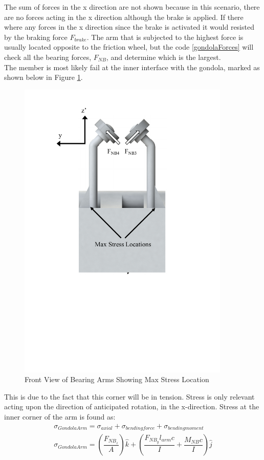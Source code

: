 \documentclass[../main.tex]{subfiles}
\begin{document}
The sum of forces in the x direction are not shown because in this scenario, there are no forces acting in the x direction although the brake is applied. If there where any forces in the x direction since the brake is activated it would resisted by the braking force $F_{brake}$. The arm that is subjected to the highest force is usually located opposite to the friction wheel, but the code \ref{gondolaForces} will check all the bearing forces, $F_{NB}$, and determine which is the largest. \\

The member is most likely fail at the inner interface with the gondola, marked as shown below in Figure \ref{fig:armStressLocation}. 
\begin{figure}[H]
	\centering
	\includegraphics[width=0.9\textwidth]{img/gondola/BearingArmStressLocation.pdf}
	\caption{Front View of Bearing Arms Showing Max Stress Location}
	\label{fig:armStressLocation}
\end{figure}
This is due to the fact that this corner will be in tension. Stress is only relevant acting upon the direction of anticipated rotation, in the x-direction. Stress at the inner corner of the arm is found as:
\begin{align}
	\sigma _{Gondola Arm} = \sigma _{axial} + \sigma _{bending force} + \sigma _{bending moment} \\ \label{armStress}
	\sigma _{Gondola Arm}  = \left(\dfrac{F_{NB_{z}}}{A}\right)\hat{k} + \left(\dfrac{F_{NB_{y}}l_{arm}c}{I}  + \dfrac{M_{NB}c}{I} \right) \hat{j}
\end{align}
\end{document}
